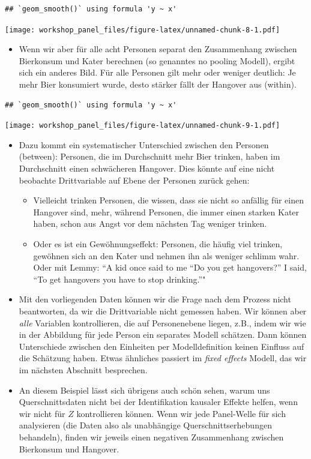 \documentclass[
]{book}
\providecommand{\tightlist}{%
  \setlength{\itemsep}{0pt}\setlength{\parskip}{0pt}}
\begin{document}
\begin{verbatim}
## `geom_smooth()` using formula 'y ~ x'
\end{verbatim}

\texttt{[image: workshop\_panel\_files/figure-latex/unnamed-chunk-8-1.pdf]}

\begin{itemize}
\tightlist
\item
  Wenn wir aber für alle acht Personen separat den Zusammenhang zwischen Bierkonsum und Kater berechnen (so genanntes no pooling Modell), ergibt sich ein anderes Bild. Für alle Personen gilt mehr oder weniger deutlich: Je mehr Bier konsumiert wurde, desto stärker fällt der Hangover aus (within).
\end{itemize}

\begin{verbatim}
## `geom_smooth()` using formula 'y ~ x'
\end{verbatim}

\texttt{[image: workshop\_panel\_files/figure-latex/unnamed-chunk-9-1.pdf]}

\begin{itemize}
\item
  Dazu kommt ein systematischer Unterschied zwischen den Personen (between): Personen, die im Durchschnitt mehr Bier trinken, haben im Durchschnitt einen schwächeren Hangover. Dies könnte auf eine nicht beobachte Drittvariable auf Ebene der Personen zurück gehen:

  \begin{itemize}
  \tightlist
  \item
    Vielleicht trinken Personen, die wissen, dass sie nicht so anfällig für einen Hangover sind, mehr, während Personen, die immer einen starken Kater haben, schon aus Angst vor dem nächsten Tag weniger trinken.
  \item
    Oder es ist ein Gewöhnungseffekt: Personen, die häufig viel trinken, gewöhnen sich an den Kater und nehmen ihn als weniger schlimm wahr. Oder mit Lemmy: ``A kid once said to me ``Do you get hangovers?'' I said, ``To get hangovers you have to stop drinking.''"
  \end{itemize}
\item
  Mit den vorliegenden Daten können wir die Frage nach dem Prozess nicht beantworten, da wir die Drittvariable nicht gemessen haben. Wir können aber \emph{alle} Variablen kontrollieren, die auf Personenebene liegen, z.B., indem wir wie in der Abbildung für jede Person ein separates Modell schätzen. Dann können Unterschiede zwischen den Einheiten per Modelldefinition keinen Einfluss auf die Schätzung haben. Etwas ähnliches passiert im \emph{fixed effects} Modell, das wir im nächsten Abschnitt besprechen.
\item
  An diesem Beispiel lässt sich übrigens auch schön sehen, warum uns Querschnittsdaten nicht bei der Identifikation kausaler Effekte helfen, wenn wir nicht für \(Z\) kontrollieren können. Wenn wir jede Panel-Welle für sich analysieren (die Daten also als unabhängige Querschnittserhebungen behandeln), finden wir jeweils einen negativen Zusammenhang zwischen Bierkonsum und Hangover.
\end{itemize}
\end{document}
